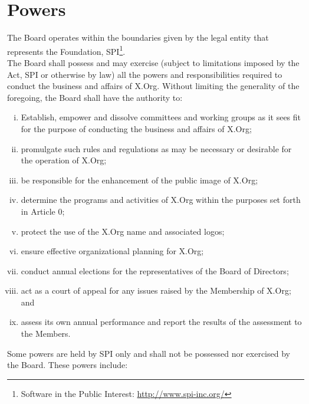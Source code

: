 \documentclass[10pt, english]{bylaws}
\begin{document}

\section{Powers}
The Board operates within the boundaries given by the legal entity that
represents the Foundation, SPI\footnote{Software
in the Public Interest: \url{http://www.spi-inc.org/}}.\\

The Board shall possess and may exercise (subject to limitations imposed by the
Act, SPI or otherwise by law) all the powers and responsibilities required to
conduct the business and affairs of X.Org. Without limiting the generality of
the foregoing, the Board shall have the authority to:

\begin{enumerate}[(i)\hspace{.2cm}]
	\item Establish, empower and dissolve committees and working groups as
	it sees fit for the purpose of conducting the business and affairs of
	X.Org;

	\item promulgate such rules and regulations as may be necessary or
	desirable for the operation of X.Org;

	\item be responsible for the enhancement of the public image of X.Org;

	\item determine the programs and activities of X.Org within the purposes
	set forth in Article 0;

	\item protect the use of the X.Org name and associated logos;

	\item ensure effective organizational planning for X.Org;

	\item conduct annual elections for the representatives of the Board of
	Directors;

	\item act as a court of appeal for any issues raised by the Membership
	of X.Org; and

	\item assess its own annual performance and report the results of the
	assessment to the Members.
\end{enumerate}

Some powers are held by SPI only and shall not be possessed nor exercised by
the Board. These powers include:
\end{document}
